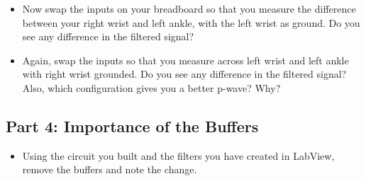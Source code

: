 \documentclass[12pt]{article}
\begin{document}
\begin{itemize}
\item Now swap the inputs on your breadboard so that you measure the difference between your right wrist and left ankle, with the left wrist as ground. Do you see any difference in the filtered signal? 
\end{itemize}


\begin{itemize}
\item  Again, swap the inputs so that you measure across left wrist and left ankle with right wrist grounded. 
Do you see any difference in the filtered signal?  
Also, which configuration gives you a better p-wave? Why?
\end{itemize}


\subsection*{Part 4: Importance of the Buffers}
\begin{itemize}
	\item Using the circuit you built and the filters you have created in LabView, remove the buffers and note the change.
\end{itemize}

\end{document}
